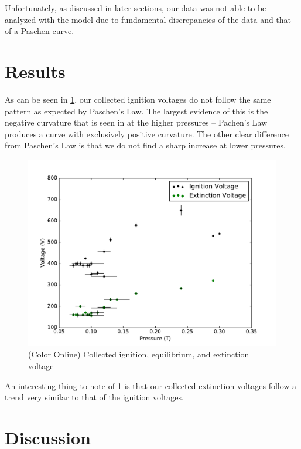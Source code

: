 \documentclass[reprint]{revtex4-1}
\begin{document}
Unfortunately, as discussed in later sections, our data was not able to be analyzed with the model due to fundamental discrepancies of the data and that of a Paschen curve.

\section{Results}

As can be seen in \cref{fig:ignition-extinction}, our collected ignition voltages do not follow the same pattern as expected by Paschen's Law. The largest evidence of this is the negative curvature that is seen in at the higher pressures -- Pachen's Law produces a curve with exclusively positive curvature. The other clear difference from Paschen's Law is that we do not find a sharp increase at lower pressures.

\begin{figure}[h]
\includegraphics[width=\columnwidth]{../resources/ignition-extinction.pdf}
\caption{(Color Online) Collected ignition, equilibrium, and extinction voltage}
\label{fig:ignition-extinction}
\end{figure}

An interesting thing to note of \cref{fig:ignition-extinction} is that our collected extinction voltages follow a trend very similar to that of the ignition voltages.

\section{Discussion}
\end{document}
